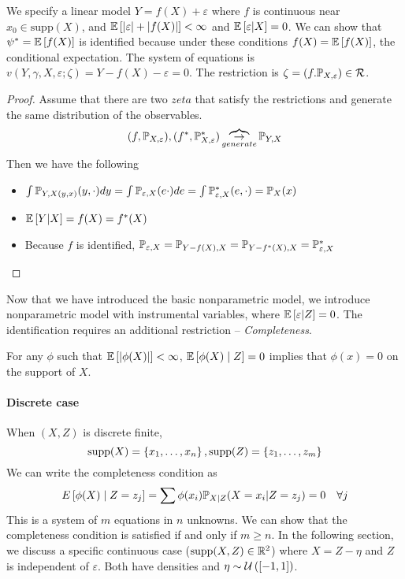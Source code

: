 \begin{exercise}
    We specify a linear model $Y=f(X)+\varepsilon$ where $f$ is continuous near $x_0 \in \text{supp}(X)$, and $\mathbb{E}\left[\left| \varepsilon\right|+\left| f(X)\right|\right]<\infty$ and $\mathbb{E}\left[\varepsilon|X\right]=0$. We can show that $\psi^*=\mathbb{E}\left[f(X)\right]$ is identified because under these conditions $f(X)=\mathbb{E}\left[f(X)\right]$, the conditional expectation. The system of equations is $v(Y,\gamma,X,\varepsilon;\zeta)=Y-f(X)-\varepsilon=0$. The restriction is $\zeta = (f.\mathbb{P}_{X,\varepsilon})\in \mathcal{R}$.
\end{exercise}
\begin{proof}
    Assume that there are two $zeta$ that satisfy the restrictions and generate the same distribution of the observables. $$(f,\mathbb{P}_{X,\varepsilon}), (f^*,\mathbb{P}_{X,\varepsilon}^*) \overbrace{\to}_{generate} \mathbb{P}_{Y,X}$$
    Then we have the following \begin{itemize}
        \item $\int \mathbb{P}_{Y,X(y,x)}(y,\cdot)dy=\int \mathbb{P}_{\varepsilon,X}(e\cdot)de=\int \mathbb{P}^*_{\varepsilon,X}(e,\cdot)=\mathbb{P}_X(x)$
        \item $\mathbb{E}\left[Y|X\right]=f(X)=f^*(X)$
        \item Because $f$ is identified,
              $\mathbb{P}_{\varepsilon,X}=\mathbb{P}_{Y-f(X),X}=\mathbb{P}_{Y-f^*(X),X}=\mathbb{P}_{\varepsilon,X}^*$
    \end{itemize}

\end{proof}
Now that we have introduced the basic nonparametric model, we introduce nonparametric model with instrumental variables, where $\mathbb{E}\left[\varepsilon|Z\right]=0$. The identification requires an additional restriction -- \emph{Completeness}.
\begin{definition}[Completeness]
    For any $\phi$ such that $\mathbb{E}\left[\left| \phi(X)\right|\right]<\infty$, $\mathbb{E}\left[\phi(X)\mid Z\right]=0$ implies that $\phi(x)=0$ on the support of $X$.
\end{definition}
\paragraph{Discrete case}
When $(X,Z)$ is discrete finite, $$\text{supp}(X)=\left\{x_1,\dots,x_n\right\},
    \text{supp}(Z)=\left\{z_1,\dots,z_m\right\}$$ We can write the completeness condition as \begin{equation*}
    E\left[\phi(X)\mid Z=z_j\right]= \sum \phi(x_i)\mathbb{P}_{X|Z}(X=x_i|Z=z_j)=0 \quad \forall j
\end{equation*}
This is a system of $m$ equations in $n$ unknowns. We can show that the completeness condition is satisfied if and only if $m\ge n$.
In the following section, we discuss a specific continuous case ($\text{supp}(X,Z)\in \mathbb{R}^2$) where $X=Z-\eta$ and $Z$ is independent of $\varepsilon$. Both have densities and  $\eta\sim \mathcal{U}\left([-1,1]\right)$.
